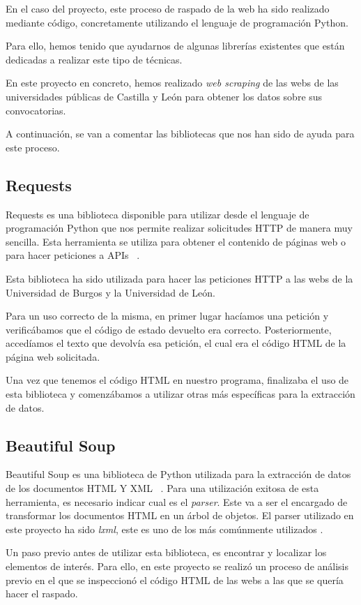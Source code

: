 En el caso del proyecto, este proceso de raspado de la web ha sido realizado mediante código, concretamente utilizando el lenguaje de programación Python.

Para ello, hemos tenido que ayudarnos de algunas librerías existentes que están dedicadas a realizar este tipo de técnicas.

En este proyecto en concreto, hemos realizado \textit{web scraping} de las webs de las universidades públicas de Castilla y León para obtener los datos sobre sus convocatorias.

A continuación, se van a comentar las bibliotecas que nos han sido de ayuda para este proceso.

\subsection{Requests}
Requests es una biblioteca disponible para utilizar desde el lenguaje de programación Python que nos permite realizar solicitudes HTTP de manera muy sencilla. Esta herramienta se utiliza para obtener el contenido de páginas web o para hacer peticiones a APIs ~\cite{requests:latex}.

Esta biblioteca ha sido utilizada para hacer las peticiones HTTP a las webs de la Universidad de Burgos y la Universidad de León. 

Para un uso correcto de la misma, en primer lugar hacíamos una petición y verificábamos que el código de estado devuelto era correcto. Posteriormente, accedíamos el texto que devolvía esa petición, el cual era el código HTML de la página web solicitada. 

Una vez que tenemos el código HTML en nuestro programa, finalizaba el uso de esta biblioteca y comenzábamos a utilizar otras más específicas para la extracción de datos.

\subsection{Beautiful Soup}
Beautiful Soup es una biblioteca de Python utilizada para la extracción de datos de los documentos HTML Y XML ~\cite{soup:latex}. Para una utilización exitosa de esta herramienta, es necesario indicar cual es el \textit{parser}. Este va a ser el encargado de transformar los documentos HTML en un árbol de objetos. El parser utilizado en este proyecto ha sido \textit{lxml}, este es uno de los más comúnmente utilizados .

Un paso previo antes de utilizar esta biblioteca, es encontrar y localizar los elementos de interés. Para ello, en este proyecto se realizó un proceso de análisis previo en el que se inspeccionó el código HTML de las webs a las que se quería hacer el raspado.

